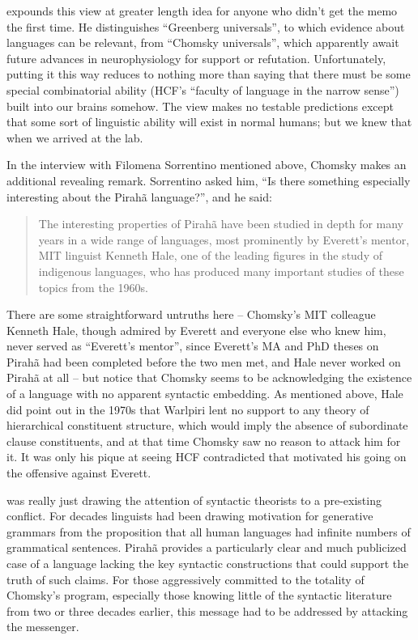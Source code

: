 \documentclass[output=paper,colorlinks,citecolor=brown
]{langscibook}
\begin{document}
\citet[792--794]{Hornstein19} expounds this view at
greater length idea for anyone who didn't get the memo the first time.
He distinguishes ``Greenberg universals'', to which evidence about languages
can be relevant, from ``Chomsky universals'', which apparently await future
advances in neurophysiology for support or refutation. Unfortunately,
putting it this way reduces to nothing more than saying that there
must be some special combinatorial ability (HCF's ``faculty of language
in the narrow sense'') built into our brains somehow. The view makes no
testable predictions except that some sort of linguistic ability will
exist in normal humans; but we knew that when we arrived at the lab.

In the interview with Filomena Sorrentino mentioned above, Chomsky makes
an additional revealing remark.  Sorrentino asked him, ``Is there something
especially interesting about the Pirah{\~a} language?'', and he said:
\begin{quote}
The interesting properties of Pirah{\~a} have been studied in depth for
many years in a wide range of languages, most prominently by Everett's
mentor, MIT linguist Kenneth Hale, one of the leading figures in the
study of indigenous languages, who has produced many important studies
of these topics from the 1960s.
\end{quote}
There are some straightforward untruths here -- Chomsky's MIT colleague
Kenneth Hale, though admired by Everett and everyone else who knew him,
never served as ``Everett's mentor'', since Everett's MA and PhD theses on
Pirah{\~a} had been completed before the two men met, and Hale never
worked on Pirah{\~a} at all -- but notice that Chomsky seems to be
acknowledging the existence of a language with no apparent syntactic
embedding. As mentioned above, Hale did point out in the 1970s that
Warlpiri lent no support to any theory of hierarchical constituent
structure, which would imply the absence of subordinate clause
constituents, and at that time Chomsky saw no reason to attack him
for it. It was only his pique at seeing HCF contradicted that motivated
his going on the offensive against Everett.

\citet{Everett05} was really just drawing the attention of syntactic
theorists to a pre-existing conflict. For decades linguists had been
drawing motivation for generative grammars from the proposition that
all human languages had infinite numbers of grammatical sentences.
Pirah{\~a} provides a particularly clear and much publicized case of
a language lacking the key syntactic constructions that could support
the truth of such claims. For those aggressively committed to the
totality of Chomsky's program, especially those knowing little of the
syntactic literature from two or three decades earlier, this message
had to be addressed by attacking the messenger.
\end{document}

